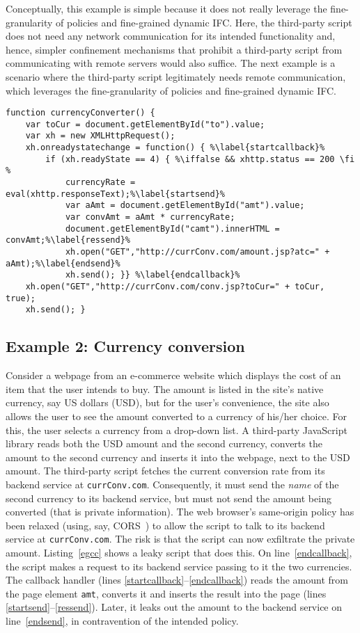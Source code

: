 Conceptually, this example is simple because it does not really
leverage the fine-granularity of {\sys} policies and fine-grained
dynamic IFC. Here, the third-party script does not need any network
communication for its intended functionality and, hence, simpler
confinement mechanisms that prohibit a third-party script from
communicating with remote servers would also suffice. The next example 
is a scenario where the third-party script legitimately needs remote
communication, which leverages the fine-granularity of {\sys} policies
and fine-grained dynamic IFC.

\begin{lstlisting}[float, caption=Currency converter script that leaks a private amount,label=egcc,escapechar=\%]
function currencyConverter() {
	var toCur = document.getElementById("to").value;
	var xh = new XMLHttpRequest();
	xh.onreadystatechange = function() { %\label{startcallback}%
		if (xh.readyState == 4) { %\iffalse && xhttp.status == 200 \fi %
			currencyRate = eval(xhttp.responseText);%\label{startsend}%
			var aAmt = document.getElementById("amt").value;
			var convAmt = aAmt * currencyRate;
			document.getElementById("camt").innerHTML = convAmt;%\label{ressend}%
			xh.open("GET","http://currConv.com/amount.jsp?atc=" + aAmt);%\label{endsend}%
			xh.send(); }} %\label{endcallback}%
	xh.open("GET","http://currConv.com/conv.jsp?toCur=" + toCur, true);
	xh.send(); }
\end{lstlisting}


\subsection{Example 2: Currency conversion}
Consider a webpage from an e-commerce website which displays the cost
of an item that the user intends to buy. The amount is listed in the
site's native currency, say US dollars (USD), but for the user's
convenience, the site also allows the user to see the amount converted
to a currency of his/her choice. For this, the user selects a currency
from a drop-down list. A third-party JavaScript library reads both the
USD amount and the second currency, converts the amount to the second
currency and inserts it into the webpage, next to the USD amount.
%
The third-party script fetches the current conversion rate from its
backend service at \texttt{currConv.com}. Consequently, it must send
the \emph{name} of the second currency to its backend service, but
must not send the amount being converted (that is private
information). The web browser's same-origin policy has been relaxed
(using, say, CORS~\cite{cors}) to allow the script to talk to its
backend service at \texttt{currConv.com}. The risk is that the script
can now exfiltrate the private amount. Listing~\ref{egcc} shows a
leaky script that does this. On line~\ref{endcallback}, the script
makes a request to its backend service passing to it the two
currencies. The callback handler (lines
\ref{startcallback}--\ref{endcallback}) reads the amount from the page
element \texttt{amt}, converts it and inserts the result into the page
(lines \ref{startsend}--\ref{ressend}). Later, it leaks out the amount
to the backend service on line~\ref{endsend}, in contravention of the
intended policy.

